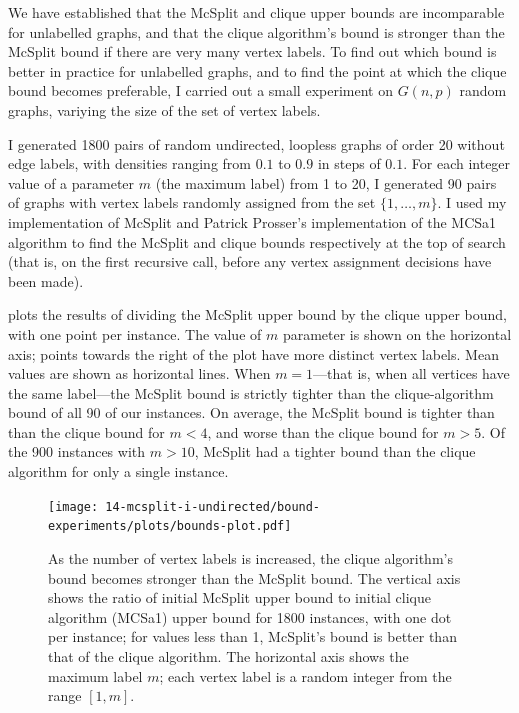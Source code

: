 We have established that the McSplit and clique upper bounds are incomparable for unlabelled graphs,
and that the clique algorithm's bound is stronger than the McSplit bound if there are very many vertex
labels.  To find out which bound is better in practice for unlabelled graphs, and to find the point
at which the clique bound becomes preferable, I carried out a small experiment on $G(n,p)$ random graphs,
variying the size of the set of vertex labels.

I generated 1800 pairs of random undirected, loopless graphs of order 20 without edge labels,
with densities ranging from $0.1$ to $0.9$
in steps of $0.1$.  For each integer value of a parameter $m$ (the maximum label) from 1 to 20, I generated
90 pairs of graphs with vertex labels randomly assigned from the set $\{1,\dots,m\}$.  I used my
implementation of McSplit and Patrick Prosser's implementation of the MCSa1 algorithm
\cite{DBLP:journals/algorithms/Prosser12} to find the McSplit and clique bounds respectively
at the top of search (that is, on the first recursive call, before any vertex assignment decisions
have been made).

 plots the results of dividing the McSplit upper bound by the
clique upper bound, with one point per instance.  The value of $m$ parameter is shown on the horizontal
axis; points towards the right of the plot have more distinct vertex labels.  Mean values
are shown as horizontal lines.  When $m=1$---that is,
when all vertices have the same label---the McSplit bound is strictly tighter than the clique-algorithm
bound of all 90 of our instances.  On average, the McSplit bound is tighter than than the clique
bound for $m < 4$, and worse than the clique bound for $m > 5$.  Of the 900 instances with $m > 10$,
McSplit had a tighter bound than the clique algorithm for only a single instance.

\begin{figure}[h!]
    \centering
    \texttt{[image: 14-mcsplit-i-undirected/bound-experiments/plots/bounds-plot.pdf]}
    \caption{As the number of vertex labels is increased, the clique algorithm's bound
    	becomes stronger than the McSplit bound.
        The vertical axis shows the ratio of initial McSplit upper bound
	to initial clique algorithm (MCSa1) upper bound for 1800 instances, with one dot per instance;
	for values less than 1, McSplit's bound is better than that of the clique algorithm.
	The horizontal axis shows the maximum label $m$; each vertex label is a random integer 
	from the range $[1,m]$.}
    \label{figure:bound-ratio}
\end{figure}

